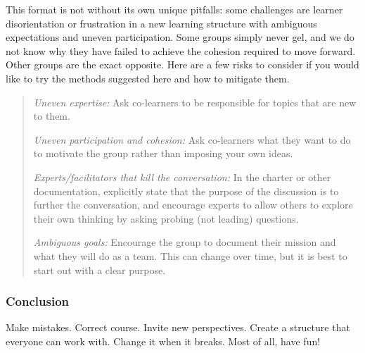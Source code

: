This format is not without its own unique pitfalls: some challenges are
learner disorientation or frustration in a new learning structure with
ambiguous expectations and uneven participation. Some groups simply
never gel, and we do not know why they have failed to achieve the
cohesion required to move forward. Other groups are the exact opposite.
Here are a few risks to consider if you would like to try the methods
suggested here and how to mitigate them.

\begin{quote}
\emph{Uneven expertise:} Ask co-learners to be responsible for topics
that are new to them.

\emph{Uneven participation and cohesion:} Ask co-learners what they want
to do to motivate the group rather than imposing your own ideas.

\emph{Experts/facilitators that kill the conversation:} In the charter
or other documentation, explicitly state that the purpose of the
discussion is to further the conversation, and encourage experts to
allow others to explore their own thinking by asking probing (not
leading) questions.

\emph{Ambiguous goals:} Encourage the group to document their mission
and what they will do as a team. This can change over time, but it is
best to start out with a clear purpose.
\end{quote}

\subsubsection{Conclusion}\label{conclusion}

Make mistakes. Correct course. Invite new perspectives. Create a
structure that everyone can work with. Change it when it breaks. Most of
all, have fun!
